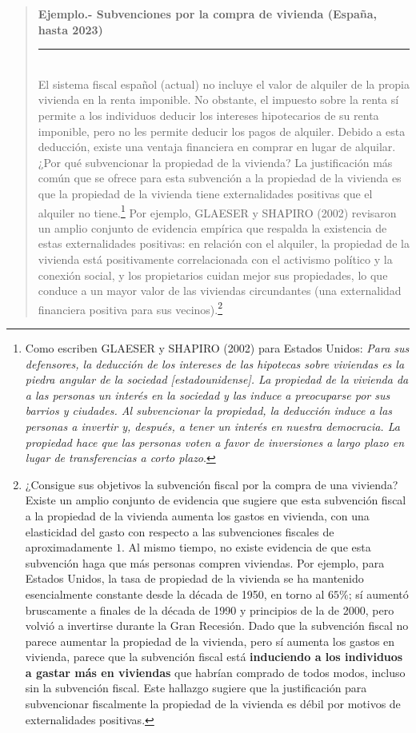\documentclass[10pt,a4paper]{article}
\newenvironment{specialblock}[1]{%
      \begin{quote} %
      \small %
      \noindent\textbf{#1}\\[-0.3em] %
      \rule{\linewidth}{0.4pt}\\[0.6em]}{
      \end{quote}}
\begin{document}
\begin{specialblock}{\textbf{Ejemplo.-} Subvenciones por la compra de vivienda (España, hasta 2023)}
    El sistema fiscal español (actual) no incluye el valor de alquiler de la propia vivienda en la renta imponible. No obstante, el impuesto sobre la renta sí permite a los individuos deducir los intereses hipotecarios de su renta imponible, pero no les permite deducir los pagos de alquiler. Debido a esta deducción, existe una ventaja financiera en comprar en lugar de alquilar. ¿Por qué subvencionar la propiedad de la vivienda? La justificación más común que se ofrece para esta subvención a la propiedad de la vivienda es que la propiedad de la vivienda tiene externalidades positivas que el alquiler no tiene.\footnote{%
        Como escriben GLAESER y SHAPIRO (2002) para Estados Unidos: \textit{Para sus defensores, la deducción de los intereses de las hipotecas sobre viviendas es la piedra angular de la sociedad [estadounidense]. La propiedad de la vivienda da a las personas un interés en la sociedad y las induce a preocuparse por sus barrios y ciudades. Al subvencionar la propiedad, la deducción induce a las personas a invertir y, después, a tener un interés en nuestra democracia. La propiedad hace que las personas voten a favor de inversiones a largo plazo en lugar de transferencias a corto plazo}.
    } Por ejemplo, GLAESER y SHAPIRO (2002) revisaron un amplio conjunto de evidencia empírica que respalda la existencia de estas externalidades positivas: en relación con el alquiler, la propiedad de la vivienda está positivamente correlacionada con el activismo político y la conexión social, y los propietarios cuidan mejor sus propiedades, lo que conduce a un mayor valor de las viviendas circundantes (una externalidad financiera positiva para sus vecinos).\footnote{%
        ¿Consigue sus objetivos la subvención fiscal por la compra de una vivienda? Existe un amplio conjunto de evidencia que sugiere que esta subvención fiscal a la propiedad de la vivienda aumenta los gastos en vivienda, con una elasticidad del gasto con respecto a las subvenciones fiscales de aproximadamente $1$. Al mismo tiempo, no existe evidencia de que esta subvención haga que más personas compren viviendas. Por ejemplo, para Estados Unidos, la tasa de propiedad de la vivienda se ha mantenido esencialmente constante desde la década de 1950, en torno al $65\%$; sí aumentó bruscamente a finales de la década de 1990 y principios de la de 2000, pero volvió a invertirse durante la Gran Recesión. Dado que la subvención fiscal no parece aumentar la propiedad de la vivienda, pero sí aumenta los gastos en vivienda, parece que la subvención fiscal está \textbf{induciendo a los individuos a gastar más en viviendas} que habrían comprado de todos modos, incluso sin la subvención fiscal. Este hallazgo sugiere que la justificación para subvencionar fiscalmente la propiedad de la vivienda es débil por motivos de externalidades positivas.
    
}
\end{specialblock}
\end{document}
